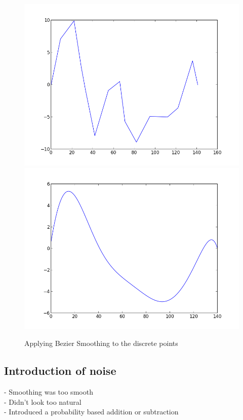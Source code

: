 \documentclass[bsc,frontabs,twoside,singlespacing,parskip]{infthesis}
\begin{document}
\begin{figure}
	\includegraphics[width=.5\textwidth]{figure_1.png}
	\includegraphics[width=.5\textwidth]{figure_2.png}
	\caption{Applying Bezier Smoothing to the discrete points}
\end{figure}

\subsection{Introduction of noise}
- Smoothing was too smooth\\
- Didn't look too natural \\
- Introduced a probability based addition or subtraction\\
\end{document}
